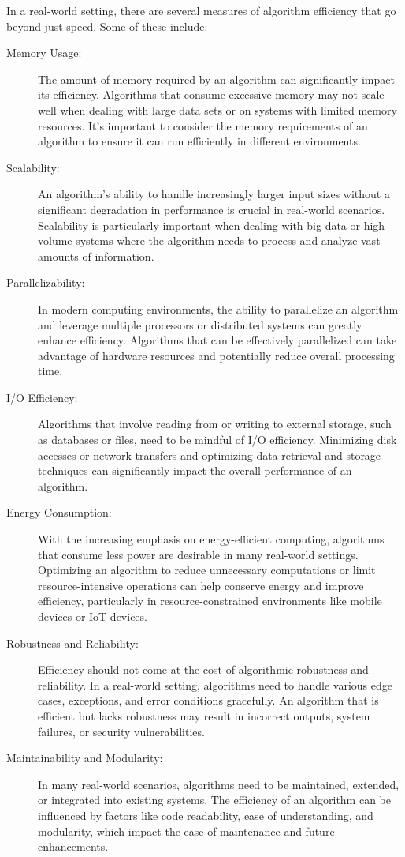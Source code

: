 In a real-world setting, there are several measures of algorithm efficiency that go beyond just speed.
Some of these include:
\begin{description}
    \item[Memory Usage:] The amount of memory required by an algorithm can significantly impact its efficiency.
    Algorithms that consume excessive memory may not scale well when dealing with large data sets or on systems with limited memory resources.
    It's important to consider the memory requirements of an algorithm to ensure it can run efficiently in different environments.
    \item[Scalability:] An algorithm's ability to handle increasingly larger input sizes without a significant degradation in performance is crucial in real-world scenarios.
    Scalability is particularly important when dealing with big data or high-volume systems where the algorithm needs to process and analyze vast amounts of information.
    \item[Parallelizability:] In modern computing environments, the ability to parallelize an algorithm and leverage multiple processors or distributed systems can greatly enhance efficiency.
    Algorithms that can be effectively parallelized can take advantage of hardware resources and potentially reduce overall processing time.
    \item[I/O Efficiency:] Algorithms that involve reading from or writing to external storage, such as databases or files, need to be mindful of I/O efficiency.
    Minimizing disk accesses or network transfers and optimizing data retrieval and storage techniques can significantly impact the overall performance of an algorithm.
    \item[Energy Consumption:] With the increasing emphasis on energy-efficient computing, algorithms that consume less power are desirable in many real-world settings.
    Optimizing an algorithm to reduce unnecessary computations or limit resource-intensive operations can help conserve energy and improve efficiency, particularly in resource-constrained environments like mobile devices or IoT devices.
    \item[Robustness and Reliability:] Efficiency should not come at the cost of algorithmic robustness and reliability.
    In a real-world setting, algorithms need to handle various edge cases, exceptions, and error conditions gracefully.
    An algorithm that is efficient but lacks robustness may result in incorrect outputs, system failures, or security vulnerabilities.
    \item[Maintainability and Modularity:] In many real-world scenarios, algorithms need to be maintained, extended, or integrated into existing systems.
    The efficiency of an algorithm can be influenced by factors like code readability, ease of understanding, and modularity, which impact the ease of maintenance and future enhancements.
\end{description}
